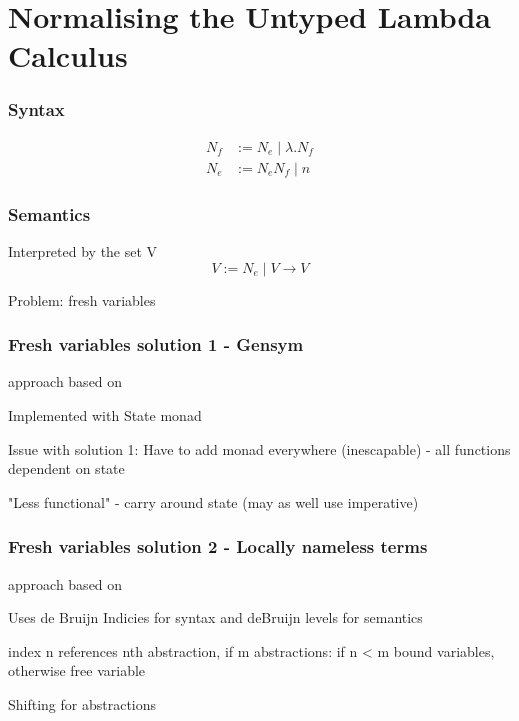 \chapter{Normalising the Untyped Lambda Calculus}
\label{chap:untypednbe}

\subsection{Syntax}
\begin{align}
    N_f &:= N_e \mid \lambda.N_f  \\
    N_e &:= N_e N_f \mid n
\end{align}
\cite{slides}

\subsection{Semantics}
Interpreted by the set V \cite{slides}
$$
    V := N_e \mid V \rightarrow V
$$

Problem: fresh variables

\subsection{Fresh variables solution 1 - Gensym}
approach based on \cite{slides}

Implemented with State monad

Issue with solution 1: Have to add monad everywhere (inescapable) - all functions dependent on state

"Less functional" - carry around state (may as well use imperative)

\subsection{Fresh variables solution 2 - Locally nameless terms}
approach based on \cite{deBruijn}

Uses de Bruijn Indicies for syntax and deBruijn levels for semantics

index n references nth abstraction,
if m abstractions: if n < m bound variables, otherwise free variable

Shifting for abstractions
